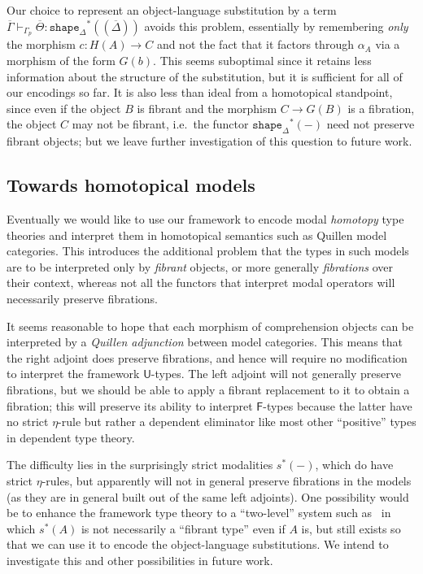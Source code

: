 \documentclass[10pt]{article}
\theoremstyle{definition}
\newcommand{\yields}{\vdash}
\newcommand\St[2]{\ensuremath{{#1}^*(#2)}}
\newcommand\ctxtuple[1]{(#1)}
\newcommand{\modeof}[1]{{#1}_p}
\newcommand{\tshape}[1]{\ensuremath{\mathtt{shape}_{#1}}}
\newcommand{\upstairs}[1]{\overline{#1}}
\begin{document}
Our choice to represent an object-language substitution by a term $\upstairs{\Gamma} \yields_{\modeof{\Gamma}} \upstairs{\Theta} : \St{\tshape{\Delta}}{\ctxtuple{\upstairs{\Delta}}}$ avoids this problem, essentially by remembering \emph{only} the morphism $c:H(A) \to C$ and not the fact that it factors through $\alpha_A$ via a morphism of the form $G(b)$.
This seems suboptimal since it retains less information about the structure of the substitution, but it is sufficient for all of our encodings so far.
It is also less than ideal from a homotopical standpoint, since even if the object $B$ is fibrant and the morphism $C\to G(B)$ is a fibration, the object $C$ may not be fibrant, i.e.\ the functor $\St{\tshape{\Delta}}{-}$ need not preserve fibrant objects; but we leave further investigation of this question to future work.

\subsection{Towards homotopical models}
\label{sec:htpy}

Eventually we would like to use our framework to encode modal \emph{homotopy} type theories and interpret them in homotopical semantics such as Quillen model categories.
This introduces the additional problem that the types in such models are to be interpreted only by \emph{fibrant} objects, or more generally \emph{fibrations} over their context, whereas not all the functors that interpret modal operators will necessarily preserve fibrations.

It seems reasonable to hope that each morphism of comprehension objects can be interpreted by a \emph{Quillen adjunction} between model categories.
This means that the right adjoint does preserve fibrations, and hence will require no modification to interpret the framework $\mathsf{U}$-types.
The left adjoint will not generally preserve fibrations, but we should be able to apply a fibrant replacement to it to obtain a fibration; this will preserve its ability to interpret $\mathsf{F}$-types because the latter have no strict $\eta$-rule but rather a dependent eliminator like most other ``positive'' types in dependent type theory.

The difficulty lies in the surprisingly strict modalities $\St{s}{-}$, which do have strict $\eta$-rules, but apparently will not in general preserve fibrations in the models (as they are in general built out of the same left adjoints).
One possibility would be to enhance the framework type theory to a ``two-level'' system such as~\cite{2ltt} in which $\St{s}{A}$ is not necessarily a ``fibrant type'' even if $A$ is, but still exists so that we can use it to encode the object-language substitutions.
We intend to investigate this and other possibilities in future work.




\end{document}
